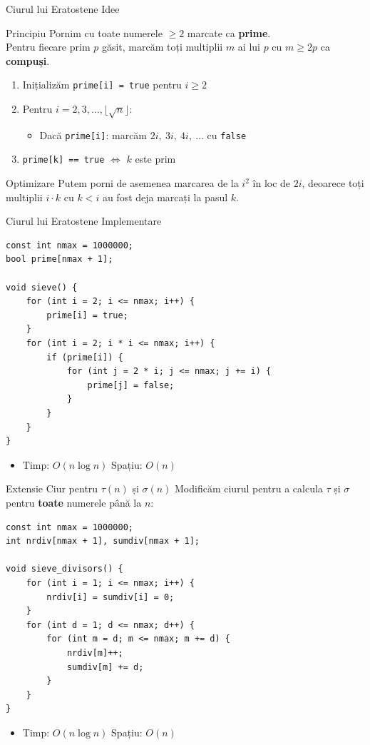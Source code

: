 \documentclass{beamer}
\begin{document}
\begin{frame}{Ciurul lui Eratostene \textemdash{} Idee}
  \begin{block}{Principiu}
    Pornim cu toate numerele $\geq 2$ marcate ca \textbf{prime}. \\
    Pentru fiecare prim $p$ găsit, marcăm toți multiplii $m$ ai lui $p$ cu $m \geq 2p$ ca \textbf{compuși}.
  \end{block}
  \bigskip
  \begin{enumerate}
    \item Inițializăm \texttt{prime[i] = true} pentru $i \geq 2$
    \item Pentru $i = 2, 3, \ldots, \lfloor\sqrt{n}\rfloor$:
    \begin{itemize}
      \item Dacă \texttt{prime[i]}: marcăm $2i,\ 3i,\ 4i,\ \ldots$ cu \texttt{false}
    \end{itemize}
    \item \texttt{prime[k] == true} $\Leftrightarrow$ $k$ este prim
  \end{enumerate}
  \medskip
  \begin{block}{Optimizare}
    Putem porni de asemenea marcarea de la $i^2$ în loc de $2i$, deoarece toți multiplii $i \cdot k$ cu $k < i$ au fost deja marcați la pasul $k$.
  \end{block}
\end{frame}

\begin{frame}{Ciurul lui Eratostene \textemdash{} Implementare}
  \begin{lstlisting}
const int nmax = 1000000;
bool prime[nmax + 1];

void sieve() {
    for (int i = 2; i <= nmax; i++) {
        prime[i] = true;
    }
    for (int i = 2; i * i <= nmax; i++) {
        if (prime[i]) {
            for (int j = 2 * i; j <= nmax; j += i) {
                prime[j] = false;
            }
        }
    }
}
  \end{lstlisting}
  \begin{itemize}
    \item Timp: $O(n \log n)$ \quad Spațiu: $O(n)$
  \end{itemize}
\end{frame}

\begin{frame}{Extensie \textemdash{} Ciur pentru $\tau(n)$ și $\sigma(n)$}
  Modificăm ciurul pentru a calcula $\tau$ și $\sigma$ pentru \textbf{toate} numerele până la $n$:
  \begin{lstlisting}
const int nmax = 1000000;
int nrdiv[nmax + 1], sumdiv[nmax + 1];

void sieve_divisors() {
    for (int i = 1; i <= nmax; i++) {
        nrdiv[i] = sumdiv[i] = 0;
    }
    for (int d = 1; d <= nmax; d++) {
        for (int m = d; m <= nmax; m += d) {
            nrdiv[m]++;
            sumdiv[m] += d;
        }
    }
}
  \end{lstlisting}
  \begin{itemize}
    \item Timp: $O(n \log n)$ \quad Spațiu: $O(n)$
  \end{itemize}
\end{frame}
\end{document}
